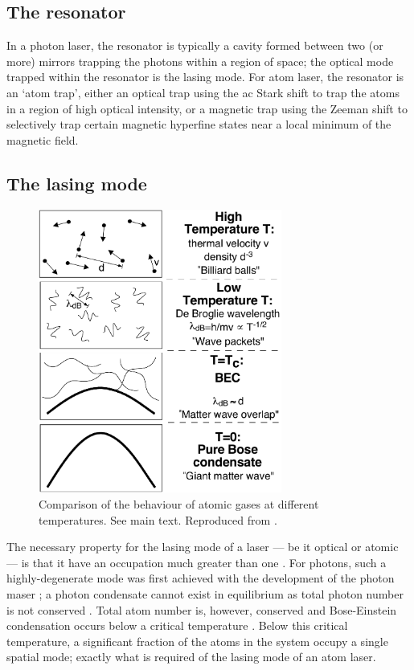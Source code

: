\subsection{The resonator}

In a photon laser, the resonator is typically a cavity formed between two (or more) mirrors trapping the photons within a region of space; the optical mode trapped within the resonator is the lasing mode.  For atom laser, the resonator is an `atom trap', either an optical trap using the ac Stark shift to trap the atoms in a region of high optical intensity, or a magnetic trap using the Zeeman shift to selectively trap certain magnetic hyperfine states near a local minimum of the magnetic field.

\subsection{The lasing mode}

\begin{figure}
    \centering
    \includegraphics[width=8cm]{WhatIsBEC}
    \caption{
        \label{Introduction:WhatIsBEC}
        Comparison of the behaviour of atomic gases at different temperatures.  See main text.  Reproduced from \citet{Ketterle:1999fk}.
    }
\end{figure}

The necessary property for the lasing mode of a laser --- be it optical or atomic --- is that it have an occupation much greater than one \citep{Wiseman:1997ba}.  For photons, such a highly-degenerate mode was first achieved with the development of the photon maser \citep{Gordon:1955}; a photon condensate cannot exist in equilibrium as total photon number is not conserved \citep{Muller:1986,Ketterle:1999fk}.  Total atom number is, however, conserved and Bose-Einstein condensation occurs below a critical temperature \citep{PethickSmith}.  Below this critical temperature, a significant fraction of the atoms in the system occupy a single spatial mode; exactly what is required of the lasing mode of an atom laser.

